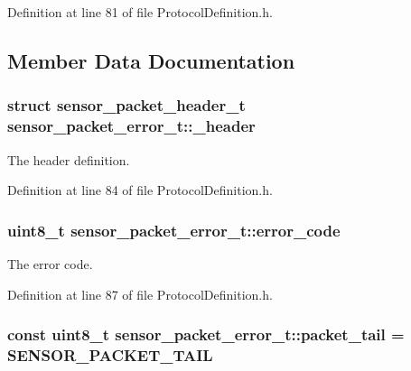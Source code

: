 \-Definition at line 81 of file \-Protocol\-Definition.\-h.



\subsection{\-Member \-Data \-Documentation}
\hypertarget{structsensor__packet__error__t_afc6ca3d4fddf28cff349a2b951a3b70c}{
\subsubsection[{\-\_\-header}]{\setlength{\rightskip}{0pt plus 5cm}struct {\bf sensor\-\_\-packet\-\_\-header\-\_\-t} {\bf sensor\-\_\-packet\-\_\-error\-\_\-t\-::\-\_\-header}}}\label{structsensor__packet__error__t_afc6ca3d4fddf28cff349a2b951a3b70c}


\-The header definition. 



\-Definition at line 84 of file \-Protocol\-Definition.\-h.

\hypertarget{structsensor__packet__error__t_a7a9d81b8541bde21d138d81872f4a1b6}{
\subsubsection[{error\-\_\-code}]{\setlength{\rightskip}{0pt plus 5cm}uint8\-\_\-t {\bf sensor\-\_\-packet\-\_\-error\-\_\-t\-::error\-\_\-code}}}\label{structsensor__packet__error__t_a7a9d81b8541bde21d138d81872f4a1b6}


\-The error code. 



\-Definition at line 87 of file \-Protocol\-Definition.\-h.

\hypertarget{structsensor__packet__error__t_ab66c67aef83ad090f7cdde358308bee8}{
\subsubsection[{packet\-\_\-tail}]{\setlength{\rightskip}{0pt plus 5cm}const uint8\-\_\-t {\bf sensor\-\_\-packet\-\_\-error\-\_\-t\-::packet\-\_\-tail} = {\bf \-S\-E\-N\-S\-O\-R\-\_\-\-P\-A\-C\-K\-E\-T\-\_\-\-T\-A\-I\-L}}}\label{structsensor__packet__error__t_ab66c67aef83ad090f7cdde358308bee8}



